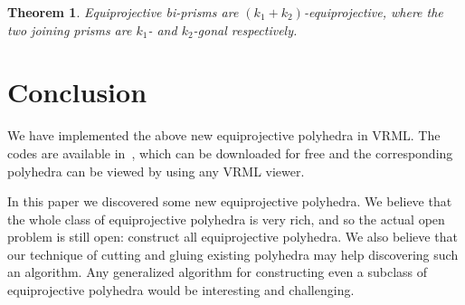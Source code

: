 \documentclass{article}
\newtheorem{theorem}{Theorem}
\begin{document}
\begin{theorem}
Equiprojective bi-prisms are $(k_1+k_2)$-equiprojective, where the
two joining prisms are $k_1$- and $k_2$-gonal respectively.
\end{theorem}


\section{Conclusion}
We have implemented the above new equiprojective polyhedra in VRML.
The codes are available in~\cite{code10}, which can be downloaded for free
and the corresponding polyhedra can be viewed by using any VRML viewer.

In this paper we discovered some new equiprojective polyhedra.
We believe that the whole class of equiprojective polyhedra
is very rich, and so the actual open problem is still open: 
construct all equiprojective polyhedra.
We also believe that our technique of cutting and gluing existing polyhedra
may help discovering such an algorithm.
Any generalized algorithm for constructing even a subclass of equiprojective polyhedra
would be interesting and challenging.



\end{document}
